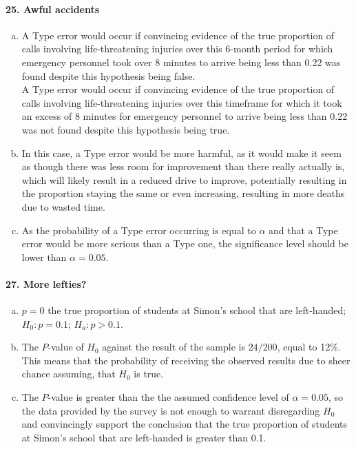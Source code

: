 		\paragraph{25. Awful accidents}
			\begin{enumerate}[a.]
				\item
					A Type  error would occur if convincing evidence of the true proportion of calls involving life-threatening injuries over this 6-month period for which emergency personnel took over 8 minutes to arrive being less than 0.22 was found despite this hypothesis being false. \\
					A Type  error would occur if convincing evidence of the true proportion of calls involving life-threatening injuries over this timeframe for which it took an excess of 8 minutes for emergency personnel to arrive being less than 0.22 was not found despite this hypothesis being true.
				\item
					In this case, a Type  error would be more harmful, as it would make it seem as though there was less room for improvement than there really actually is, which will likely result in a reduced drive to improve, potentially resulting in the proportion staying the same or even increasing, resulting in more deaths due to wasted time.
				\item
					As the probability of a Type  error occurring is equal to $\alpha$ and that a Type  error would be more serious than a Type  one, the significance level should be lower than $\alpha = 0.05$.
			\end{enumerate}
		\paragraph{27. More lefties?}
			\begin{enumerate}[a.]
				\item 
					$p = 0$ the true proportion of students at Simon's school that are left-handed; $H_0:p = 0.1$; $H_a:p > 0.1$.
				\item
					The $P$-value of $H_0$ against the result of the sample is $24/200$, equal to 12\%. This means that the probability of receiving the observed results due to sheer chance assuming, that $H_0$ is true.
				\item
					The $P$-value is greater than the the assumed confidence level of $\alpha = 0.05$, so the data provided by the survey is not enough to warrant disregarding $H_0$ and convincingly support the conclusion that the true proportion of students at Simon's school that are left-handed is greater than 0.1.
			\end{enumerate}
